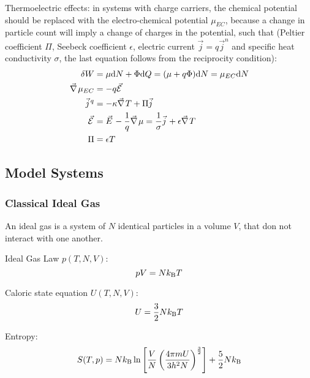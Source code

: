 		\noindent
		Thermoelectric effects: in systems with charge carriers, the chemical potential should be replaced with the electro-chemical potential $\mu_{EC}$, because a change in particle count will imply a change of charges in the potential, such that (Peltier coefficient $\Pi$, Seebeck coefficient $\epsilon$, electric current $\vec{j} = q\vec{j}^n$ and specific heat conductivity $\sigma$, the last equation follows from the reciprocity condition):
		\begin{equation}
			\begin{aligned}
				\delta W &= \mu \dd N + \Phi \dd Q = (\mu+q\Phi)\dd N = \mu_{EC} \dd N \\
				\Nabla \mu_{EC} &= -q\vec{\mathcal{E}} \\
				\vec{j}^q &= - \kappa \Nabla T + \Pi \vec{j} \\
				\vec{\mathcal{E}} &= \vec{E} - \frac{1}{q} \Nabla \mu = \frac{1}{\sigma} \vec{j} + \epsilon \Nabla T \\
				\Pi &= \epsilon T \\
			\end{aligned}
		\end{equation}

	\subsection{Model Systems}
		\subsubsection{Classical Ideal Gas}
			\noindent
			An ideal gas is a system of $N$ identical particles in a volume $V$, that don not interact with one another.\vsp

			\noindent
			Ideal Gas Law $p(T, N, V)$:
			\begin{equation}
				pV = N k_{\text{B}} T
			\end{equation}

			\noindent
			Caloric state equation $U(T, N, V)$:
			\begin{equation}
				U = \frac{3}{2} N k_{\text{B}} T
			\end{equation}

			\noindent
			Entropy:
			\begin{equation}
				S(T,p) = N k_{\text{B}} \ln{\left[ \frac{V}{N}\left( \frac{4\pi m	U}{3 h^2 N} \right)^{\frac{3}{2}} \right]} + \frac{5}{2} N k_{\text{B}}
			\end{equation}


